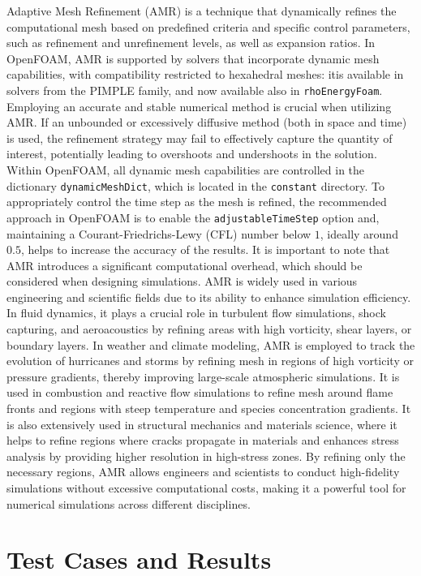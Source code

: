 \documentclass[a5paper]{sapthesis}
\begin{document}
	Adaptive Mesh Refinement (AMR) is a technique that dynamically refines the computational mesh based on predefined criteria and specific control parameters, such as refinement and unrefinement levels, as well as expansion ratios. In OpenFOAM, AMR is supported by solvers that incorporate dynamic mesh capabilities, with compatibility restricted to hexahedral meshes: itis  available in solvers from the PIMPLE family, and now available also in \texttt{rhoEnergyFoam}. Employing an accurate and stable numerical method is crucial when utilizing AMR. If an unbounded or excessively diffusive method (both in space and time) is used, the refinement strategy may fail to effectively capture the quantity of interest, potentially leading to overshoots and undershoots in the solution. Within OpenFOAM, all dynamic mesh capabilities are controlled in the dictionary \texttt{dynamicMeshDict}, which is located in the \texttt{constant} directory. To appropriately control the time step as the mesh is refined, the recommended approach in OpenFOAM is to enable the \texttt{adjustableTimeStep} option and, maintaining a Courant-Friedrichs-Lewy (CFL) number below $1$, ideally around $0.5$, helps to increase the accuracy of the results. It is important to note that AMR introduces a significant computational overhead, which should be considered when designing simulations. AMR is widely used in various engineering and scientific fields due to its ability to enhance simulation efficiency. In fluid dynamics, it plays a crucial role in turbulent flow simulations, shock capturing, and aeroacoustics by refining areas with high vorticity, shear layers, or boundary layers. In weather and climate modeling, AMR is employed to track the evolution of hurricanes and storms by refining mesh in regions of high vorticity or pressure gradients, thereby improving large-scale atmospheric simulations. It is used in combustion and reactive flow simulations to refine mesh around flame fronts and regions with steep temperature and species concentration gradients. It is also extensively used in structural mechanics and materials science, where it helps to refine regions where cracks propagate in materials and enhances stress analysis by providing higher resolution in high-stress zones. By refining only the necessary regions, AMR allows engineers and scientists to conduct high-fidelity simulations without excessive computational costs, making it a powerful tool for numerical simulations across different disciplines.
	
	\chapter{Test Cases and Results}
	\label{chap:results}
	
\end{document}
